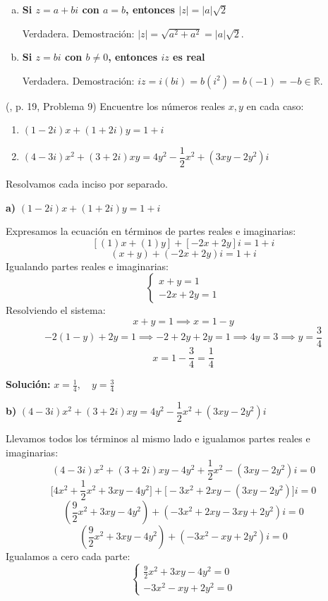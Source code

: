 \begin{prob}
\begin{myproof}
\begin{enumerate}[a)]
\item \textbf{Si $z=a+bi$ con $a=b$, entonces $|z|=|a|\sqrt{2}$}

Verdadera.  
Demostración: $|z| = \sqrt{a^2 + a^2} = |a|\sqrt{2}$.

\item \textbf{Si $z=bi$ con $b\neq 0$, entonces $iz$ es real}

Verdadera.  
Demostración: $iz = i(bi) = b(i^2) = b(-1) = -b \in \mathbb{R}$.
\end{enumerate}
\end{myproof}

\end{prob}

\begin{prob} (\cite{andreescu2014complex}, p. 19, Problema 9) Encuentre los números reales $x, y$ en cada caso:
\begin{enumerate}[$a)$]
\item $(1-2i)x + (1+2i)y=1+i$
\item $(4-3i)x^2+(3+2i)xy=4y^2-\dfrac{1}{2}x^2+(3xy-2y^2)i$
\end{enumerate}
\begin{myproof}
Resolvamos cada inciso por separado.

\textbf{a)} \quad $(1-2i)x + (1+2i)y = 1 + i$

Expresamos la ecuación en términos de partes reales e imaginarias:
\[
[(1)x + (1)y] + [-2x + 2y]i = 1 + i
\]
\[
(x + y) + (-2x + 2y)i = 1 + i
\]
Igualando partes reales e imaginarias:
\[
\begin{cases}
x + y = 1 \\
-2x + 2y = 1
\end{cases}
\]
Resolviendo el sistema:
\[
x + y = 1 \implies x = 1 - y
\]
\[
-2(1 - y) + 2y = 1 \implies -2 + 2y + 2y = 1 \implies 4y = 3 \implies y = \frac{3}{4}
\]
\[
x = 1 - \frac{3}{4} = \frac{1}{4}
\]

\textbf{Solución:} $\boxed{x = \frac{1}{4},\quad y = \frac{3}{4}}$

\vspace{1em}

\textbf{b)} \quad $(4-3i)x^2 + (3+2i)xy = 4y^2 - \dfrac{1}{2}x^2 + (3xy - 2y^2)i$

Llevamos todos los términos al mismo lado e igualamos partes reales e imaginarias:
\[
(4-3i)x^2 + (3+2i)xy - 4y^2 + \frac{1}{2}x^2 - (3xy-2y^2)i = 0
\]
\[
\bigg[4x^2 + \frac{1}{2}x^2 + 3xy - 4y^2\bigg] + \bigg[-3x^2 + 2xy - (3xy - 2y^2)\bigg]i = 0
\]
\[
\left(\frac{9}{2}x^2 + 3xy - 4y^2\right) + \left(-3x^2 + 2xy - 3xy + 2y^2\right)i = 0
\]
\[
\left(\frac{9}{2}x^2 + 3xy - 4y^2\right) + \left(-3x^2 - xy + 2y^2\right)i = 0
\]
Igualamos a cero cada parte:
\[
\begin{cases}
\frac{9}{2}x^2 + 3xy - 4y^2 = 0 \\
-3x^2 - xy + 2y^2 = 0
\end{cases}
\]


\end{myproof}
\end{prob}
